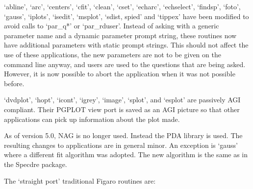    `abline', `arc', `centers', `cfit', `clean', `cset', `echarc',
   `echselect', `findsp', `foto', `gauss', `iplots', `isedit', `msplot',
   `sdist, spied' and `tippex' have been modified to avoid calls to
   `par\_q*' or `par\_rduser'.  Instead of asking with a generic parameter
   name and a dynamic parameter prompt string, these routines now have
   additional parameters with static prompt strings.  This should not
   affect the use of these applications, the new parameters are not to
   be given on the command line anyway, and users are used to the
   questions  that are being asked.  However, it is now possible to
   abort the application when it was not possible before.

   `dvdplot', `hopt', `icont', `igrey', `image', `splot', and `esplot'
   are passively AGI compliant. Their PGPLOT view port is saved as an AGI
   picture so that other applications can pick up information about the
   plot made.

   As of version 5.0, NAG is no longer used. Instead the PDA library is
   used. The resulting changes to applications are in general minor. An
   exception is `gauss' where a different fit algorithm was adopted. The
   new algorithm is the same as in the Specdre package.

   The `straight port' traditional Figaro routines are:


